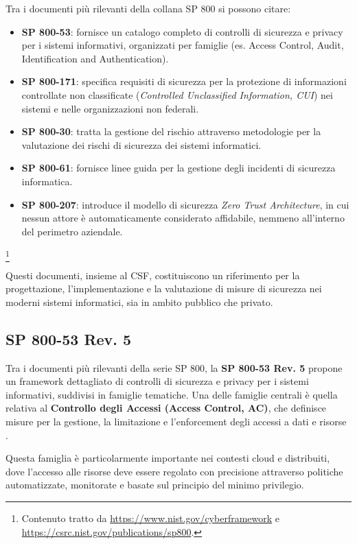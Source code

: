 Tra i documenti più rilevanti della collana SP 800 si possono citare:

\begin{itemize}
    \item \textbf{SP 800-53}: fornisce un catalogo completo di controlli di sicurezza e privacy per i sistemi informativi, organizzati per famiglie (es. Access Control, Audit, Identification and Authentication).
    \item \textbf{SP 800-171}: specifica requisiti di sicurezza per la protezione di informazioni controllate non classificate (\textit{Controlled Unclassified Information, CUI}) nei sistemi e nelle organizzazioni non federali.
    \item \textbf{SP 800-30}: tratta la gestione del rischio attraverso metodologie per la valutazione dei rischi di sicurezza dei sistemi informatici.
    \item \textbf{SP 800-61}: fornisce linee guida per la gestione degli incidenti di sicurezza informatica.
    \item \textbf{SP 800-207}: introduce il modello di sicurezza \textit{Zero Trust Architecture}, in cui nessun attore è automaticamente considerato affidabile, nemmeno all'interno del perimetro aziendale.
\end{itemize}

\footnote{Contenuto tratto da \url{https://www.nist.gov/cyberframework} e \url{https://csrc.nist.gov/publications/sp800}.}

Questi documenti, insieme al CSF, costituiscono un riferimento per la progettazione, l'implementazione e la valutazione di misure di sicurezza nei moderni sistemi informatici, sia in ambito pubblico che privato.


\subsection{SP 800-53 Rev. 5}
\label{sec:nist_sp800_ac}

Tra i documenti più rilevanti della serie SP 800, la \textbf{SP 800-53 Rev. 5} propone un framework dettagliato di controlli di sicurezza e privacy per i sistemi informativi, suddivisi in famiglie tematiche. Una delle famiglie centrali è quella relativa al \textbf{Controllo degli Accessi (Access Control, AC)}, che definisce misure per la gestione, la limitazione e l'enforcement degli accessi a dati e risorse \cite{tariq2017risk}.

Questa famiglia è particolarmente importante nei contesti cloud e distribuiti, dove l'accesso alle risorse deve essere regolato con precisione attraverso politiche automatizzate, monitorate e basate sul principio del minimo privilegio.

